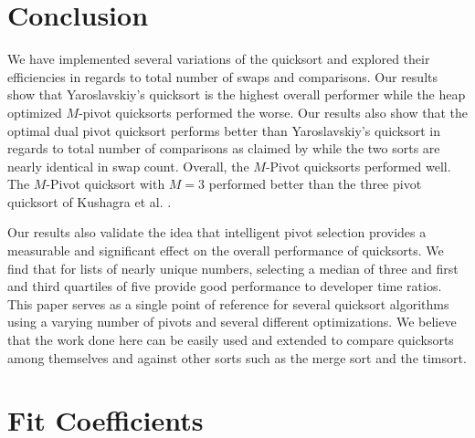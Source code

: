 		

\section{Conclusion}
	\label{sec:Conclusionn}
	We have implemented several variations of the quicksort and explored their efficiencies in regards to total number of swaps and comparisons. Our results show that Yaroslavskiy's quicksort is the highest overall performer while the heap optimized $M$-pivot quicksorts performed the worse.  Our results also show that the optimal dual pivot quicksort performs better than Yaroslavskiy's quicksort in regards to total number of comparisons as claimed by \cite{Aumuller:2013:OPD:2525857.2525862} while the two sorts are nearly identical in swap count. Overall, the $M$-Pivot quicksorts performed well. The $M$-Pivot quicksort with $M=3$ performed better than the three pivot quicksort of Kushagra et al. \cite{kushagra2013multi}. 

	Our results also validate the idea that intelligent pivot selection provides a measurable and significant effect on the overall performance of quicksorts. We find that for lists of nearly unique numbers, selecting a median of three and first and third quartiles of five provide good performance to developer time ratios. This paper serves as a single point of reference for several quicksort algorithms using a varying number of pivots and several different optimizations. We believe that the work done here can be easily used and extended to compare quicksorts among themselves and against other sorts such as the merge sort and the timsort.
	




\section{Fit Coefficients}
	\label{sec:FitCoefficients}

